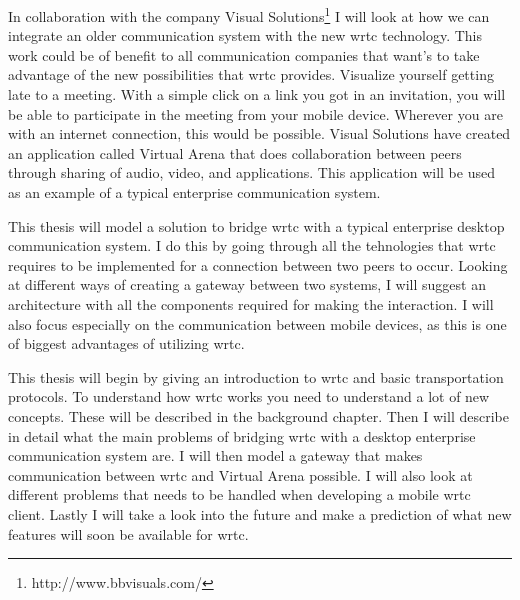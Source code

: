 In collaboration with the company Visual Solutions\footnote{http://www.bbvisuals.com/} I will look at how we can integrate an older communication system with the new \gls{wrtc} technology. This work could be of benefit to all communication companies that want's to take advantage of the new possibilities that \gls{wrtc} provides. Visualize yourself getting late to a meeting. With a simple click on a link you got in an invitation, you will be able to participate in the meeting from your mobile device. Wherever you are with an internet connection, this would be possible. Visual Solutions have created an application called Virtual Arena that does collaboration between peers through sharing of audio, video, and applications. This application will be used as an example of a typical enterprise communication system.

This thesis will model a solution to bridge \gls{wrtc} with a typical enterprise desktop communication system. I do this by going through all the tehnologies that \gls{wrtc} requires to be implemented for a connection between two peers to occur. Looking at different ways of creating a gateway between two systems, I will suggest an architecture with all the components required for making the interaction. I will also focus especially on the communication between mobile devices, as this is one of biggest advantages of utilizing \gls{wrtc}.

This thesis will begin by giving an introduction to \gls{wrtc} and basic transportation protocols. To understand how \gls{wrtc} works you need to understand a lot of new concepts. These will be described in the background chapter. Then I will describe in detail what the main problems of bridging \gls{wrtc} with a desktop enterprise communication system are. I will then model a gateway that makes communication between \gls{wrtc} and Virtual Arena possible. I will also look at different problems that needs to be handled when developing a mobile \gls{wrtc} client. Lastly I will take a look into the future and make a prediction of what new features will soon be available for \gls{wrtc}.